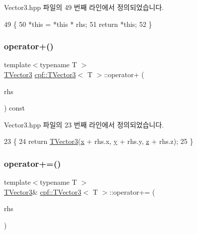 Vector3.\+hpp 파일의 49 번째 라인에서 정의되었습니다.


\begin{DoxyCode}
49                                                   \{
50             *\textcolor{keyword}{this} = *\textcolor{keyword}{this} * rhs;
51             \textcolor{keywordflow}{return} *\textcolor{keyword}{this};
52         \}
\end{DoxyCode}
\mbox{\label{classcpf_1_1_t_vector3_ad0591c5ed4645d82dbcbe6796af3ba3f}} 
\subsubsection{\texorpdfstring{operator+()}{operator+()}}
{\footnotesize\ttfamily template$<$typename T $>$ \\
\hyperlink{classcpf_1_1_t_vector3}{T\+Vector3} \hyperlink{classcpf_1_1_t_vector3}{cpf\+::\+T\+Vector3}$<$ T $>$\+::operator+ (\begin{DoxyParamCaption}\item[{const \hyperlink{classcpf_1_1_t_vector3}{T\+Vector3}$<$ T $>$ \&}]{rhs }\end{DoxyParamCaption}) const\hspace{0.3cm}{\ttfamily [inline]}}



Vector3.\+hpp 파일의 23 번째 라인에서 정의되었습니다.


\begin{DoxyCode}
23                                                       \{
24             \textcolor{keywordflow}{return} \hyperlink{classcpf_1_1_t_vector3_a31544bebbd3d8737adf44460256b57fd}{TVector3}(\hyperlink{classcpf_1_1_t_vector3_ad3df42808358a64c518d6349ede446d8}{x} + rhs.x, \hyperlink{classcpf_1_1_t_vector3_a2371a0583e76dcc80c6f10dd168cde1b}{y} + rhs.y, \hyperlink{classcpf_1_1_t_vector3_ae7ea5f4b24c3438a44eb6b0fdfe02823}{z} + rhs.z);
25         \}
\end{DoxyCode}
\mbox{\label{classcpf_1_1_t_vector3_a32e8331dbaec9ff1cc18982c0c847ebe}} 
\subsubsection{\texorpdfstring{operator+=()}{operator+=()}}
{\footnotesize\ttfamily template$<$typename T $>$ \\
\hyperlink{classcpf_1_1_t_vector3}{T\+Vector3}\& \hyperlink{classcpf_1_1_t_vector3}{cpf\+::\+T\+Vector3}$<$ T $>$\+::operator+= (\begin{DoxyParamCaption}\item[{const \hyperlink{classcpf_1_1_t_vector3}{T\+Vector3}$<$ T $>$ \&}]{rhs }\end{DoxyParamCaption})\hspace{0.3cm}{\ttfamily [inline]}}



